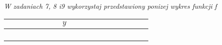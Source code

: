 \documentclass[a4paper,12pt]{article}
\begin{document}
{\it W zadaniach 7, 8 i9 wykorzystaj przedstawiony ponizej wykres funkcji f}
\begin{center}
\begin{tabular}{|l|l|l|l|l|l|l|l|l|l|l|l|l|l|l|l|l|l|}
\hline
\multicolumn{1}{|l|}{}&	\multicolumn{1}{|l|}{}&	\multicolumn{1}{|l|}{}&	\multicolumn{1}{|l|}{}&	\multicolumn{1}{|l|}{}&	\multicolumn{1}{|l|}{}&	\multicolumn{1}{|l|}{}&	\multicolumn{1}{|l|}{$y$}&	\multicolumn{1}{|l|}{}&	\multicolumn{1}{|l|}{}&	\multicolumn{1}{|l|}{}&	\multicolumn{1}{|l|}{}&	\multicolumn{1}{|l|}{}&	\multicolumn{1}{|l|}{}&	\multicolumn{1}{|l|}{}&	\multicolumn{1}{|l|}{}&	\multicolumn{1}{|l|}{}&	\multicolumn{1}{|l|}{}	\\
\hline
\multicolumn{1}{|l|}{}&	\multicolumn{1}{|l|}{}&	\multicolumn{1}{|l|}{}&	\multicolumn{1}{|l|}{}&	\multicolumn{1}{|l|}{}&	\multicolumn{1}{|l|}{}&	\multicolumn{1}{|l|}{}&	\multicolumn{1}{|l|}{}&	\multicolumn{1}{|l|}{}&	\multicolumn{1}{|l|}{}&	\multicolumn{1}{|l|}{}&	\multicolumn{1}{|l|}{}&	\multicolumn{1}{|l|}{}&	\multicolumn{1}{|l|}{}&	\multicolumn{1}{|l|}{}&	\multicolumn{1}{|l|}{}&	\multicolumn{1}{|l|}{}&	\multicolumn{1}{|l|}{}	\\
\hline
\multicolumn{1}{|l|}{}&	\multicolumn{1}{|l|}{}&	\multicolumn{1}{|l|}{}&	\multicolumn{1}{|l|}{}&	\multicolumn{1}{|l|}{}&	\multicolumn{1}{|l|}{}&	\multicolumn{1}{|l|}{}&	\multicolumn{1}{|l|}{}&	\multicolumn{1}{|l|}{}&	\multicolumn{1}{|l|}{}&	\multicolumn{1}{|l|}{}&	\multicolumn{1}{|l|}{}&	\multicolumn{1}{|l|}{}&	\multicolumn{1}{|l|}{}&	\multicolumn{1}{|l|}{}&	\multicolumn{1}{|l|}{}&	\multicolumn{1}{|l|}{}&	\multicolumn{1}{|l|}{}	\\
\hline
\multicolumn{1}{|l|}{}&	\multicolumn{1}{|l|}{}&	\multicolumn{1}{|l|}{}&	\multicolumn{1}{|l|}{}&	\multicolumn{1}{|l|}{}&	\multicolumn{1}{|l|}{}&	\multicolumn{1}{|l|}{}&	\multicolumn{1}{|l|}{}&	\multicolumn{1}{|l|}{}&	\multicolumn{1}{|l|}{}&	\multicolumn{1}{|l|}{}&	\multicolumn{1}{|l|}{}&	\multicolumn{1}{|l|}{}&	\multicolumn{1}{|l|}{}&	\multicolumn{1}{|l|}{}&	\multicolumn{1}{|l|}{}&	\multicolumn{1}{|l|}{}&	\multicolumn{1}{|l|}{}	\\
\hline
\multicolumn{1}{|l|}{}&	\multicolumn{1}{|l|}{}&	\multicolumn{1}{|l|}{}&	\multicolumn{1}{|l|}{}&	\multicolumn{1}{|l|}{}&	\multicolumn{1}{|l|}{}&	\multicolumn{1}{|l|}{}&	\multicolumn{1}{|l|}{}&	\multicolumn{1}{|l|}{}&	\multicolumn{1}{|l|}{}&	\multicolumn{1}{|l|}{}&	\multicolumn{1}{|l|}{}&	\multicolumn{1}{|l|}{}&	\multicolumn{1}{|l|}{}&	\multicolumn{1}{|l|}{}&	\multicolumn{1}{|l|}{}&	\multicolumn{1}{|l|}{}&	\multicolumn{1}{|l|}{}	\\

\end{tabular}
\end{center}
\end{document}
